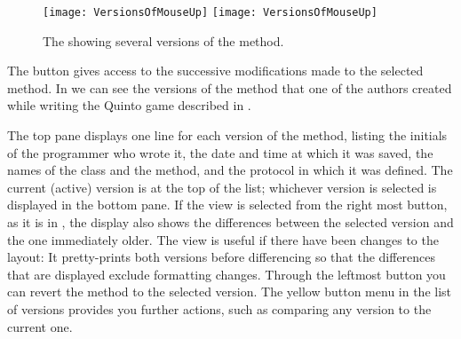 \documentclass[a4paper,10pt,twoside]{book}
\begin{document}
\begin{figure}[btp]
   \centering
   \ifluluelse
	   {\texttt{[image: VersionsOfMouseUp]} }
	   {\texttt{[image: VersionsOfMouseUp]} }
   \caption{The  showing several versions of the  method.}
   \label{fig:mouseUpVersions}
\end{figure}
The  button gives access to the successive modifications made to the selected method.
In  we can see the versions of the  method that one of the authors created while writing the Quinto game described in .

The top pane displays one line for each version of the method, listing the initials of the programmer who wrote it, the date and time at which it was saved, the names of the class and the method, and the protocol in which it was defined.
The current (active) version is at the top of the list; whichever version is selected is displayed in the bottom pane.
If the  view is selected from the right most button, as it is in , the display also shows the differences between the selected version and the one immediately older.
The  view is useful if there have been changes to the layout: It pretty-prints both versions before differencing so that the differences that are displayed exclude formatting changes.
Through the leftmost button you can revert the method to the selected version.
The yellow button menu in the list of versions provides you further actions, such as comparing any version to the current one.
\end{document}
